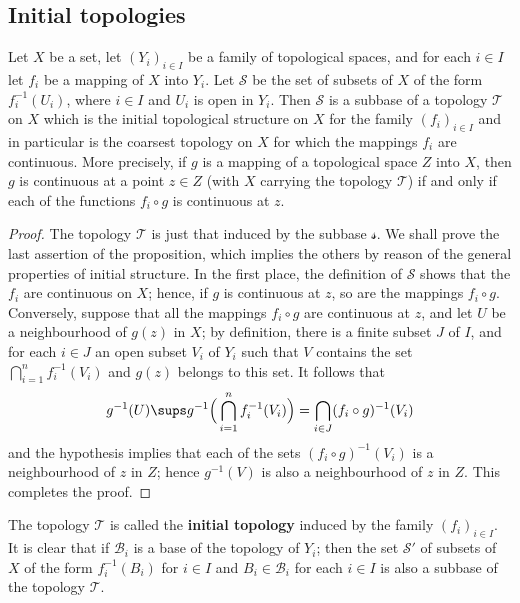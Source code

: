 \subsection{Initial topologies}
\begin{proposition}\label{topo space initial topology definition}
Let $X$ be a set, let $(Y_i)_{i\in I}$ be a family of topological spaces, and for each $i\in I$ let $f_i$ be a mapping of $X$ into $Y_i$. Let $\mathcal{S}$ be the set of subsets of $X$ of the form $f_i^{-1}(U_i)$, where $i\in I$ and $U_i$ is open in $Y_i$. Then $\mathcal{S}$ is a subbase of a topology $\mathcal{T}$ on $X$ which is the initial topological structure on $X$ for the family $(f_i)_{i\in I}$ and in particular is the coarsest topology on $X$ for which the mappings $f_i$ are continuous. More precisely, if $g$ is a mapping of a topological space $Z$ into $X$, then $g$ is continuous at a point $z\in Z$ (with $X$ carrying the topology $\mathcal{T}$) if and only if each of the functions $f_i\circ g$ is continuous at $z$.
\end{proposition}
\begin{proof}
The topology $\mathcal{T}$ is just that induced by the subbase $\mathcal{s}$. We shall prove the last assertion of the proposition, which implies the others by reason of the general properties of initial structure. In the first place, the definition of $\mathcal{S}$ shows that the $f_i$ are continuous on $X$; hence, if $g$ is continuous at $z$, so are the mappings $f_i\circ g$. Conversely, suppose that all the mappings $f_i\circ g$ are continuous at $z$, and let $U$ be a neighbourhood of $g(z)$ in $X$; by definition, there is a finite subset $J$ of $I$, and for each $i\in J$ an open subset $V_i$ of $Y_i$ such that $V$ contains the set $\bigcap_{i=1}^{n}f_i^{-1}(V_i)$ and $g(z)$ belongs to this set. It follows that
\[g^{-1}(U)\sups g^{-1}\Big(\bigcap_{i=1}^{n}f_i^{-1}(V_i)\Big)=\bigcap_{i\in J}(f_i\circ g)^{-1}(V_i)\]
and the hypothesis implies that each of the sets $(f_i\circ g)^{-1}(V_i)$ is a neighbourhood of $z$ in $Z$; hence $g^{-1}(V)$ is also a neighbourhood of $z$ in $Z$. This completes the proof.
\end{proof}
The topology $\mathcal{T}$ is called the \textbf{initial topology} induced by the family $(f_i)_{i\in I}$. It is clear that if $\mathcal{B}_i$ is a base of the topology of $Y_i$; then the set $\mathcal{S}'$ of subsets of $X$ of the form $f_i^{-1}(B_i)$ for $i\in I$ and $B_i\in\mathcal{B}_i$ for each $i\in I$ is also a subbase of the topology $\mathcal{T}$.\par
